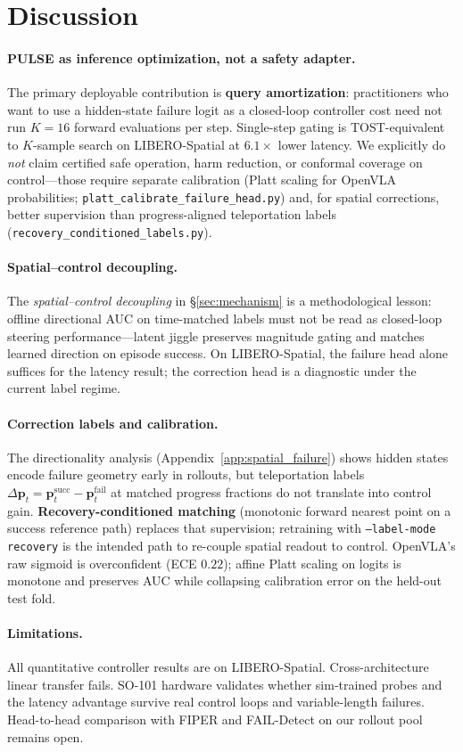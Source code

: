 \section{Discussion}
\label{sec:discussion}

\paragraph{PULSE as inference optimization, not a safety adapter.}
The primary deployable contribution is \textbf{query amortization}: practitioners who want to use a hidden-state failure logit as a closed-loop controller cost need not run $K{=}16$ forward evaluations per step. Single-step gating is TOST-equivalent to $K$-sample search on LIBERO-Spatial at $6.1{\times}$ lower latency. We explicitly do \emph{not} claim certified safe operation, harm reduction, or conformal coverage on control---those require separate calibration (Platt scaling for OpenVLA probabilities; \texttt{platt\_calibrate\_failure\_head.py}) and, for spatial corrections, better supervision than progress-aligned teleportation labels (\texttt{recovery\_conditioned\_labels.py}).

\paragraph{Spatial--control decoupling.}
The \emph{spatial--control decoupling} in \S\ref{sec:mechanism} is a methodological lesson: offline directional AUC on time-matched labels must not be read as closed-loop steering performance---latent jiggle preserves magnitude gating and matches learned direction on episode success. On LIBERO-Spatial, the failure head alone suffices for the latency result; the correction head is a diagnostic under the current label regime.

\paragraph{Correction labels and calibration.}
The directionality analysis (Appendix~\ref{app:spatial_failure}) shows hidden states encode failure geometry early in rollouts, but teleportation labels $\Delta\mathbf{p}_t = \mathbf{p}^{\mathrm{succ}}_t - \mathbf{p}^{\mathrm{fail}}_t$ at matched progress fractions do not translate into control gain. \textbf{Recovery-conditioned matching} (monotonic forward nearest point on a success reference path) replaces that supervision; retraining with \texttt{--label-mode recovery} is the intended path to re-couple spatial readout to control. OpenVLA's raw sigmoid is overconfident (ECE $0.22$); affine Platt scaling on logits is monotone and preserves AUC while collapsing calibration error on the held-out test fold.

\paragraph{Limitations.}
All quantitative controller results are on LIBERO-Spatial. Cross-architecture linear transfer fails. SO-101 hardware validates whether sim-trained probes and the latency advantage survive real control loops and variable-length failures. Head-to-head comparison with FIPER and FAIL-Detect on our rollout pool remains open.
